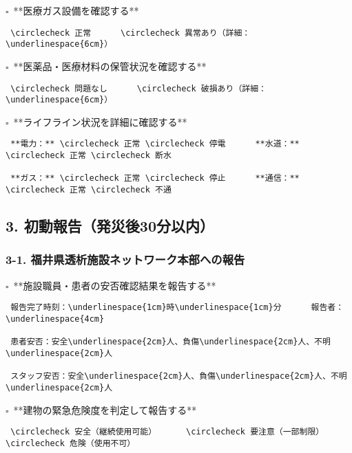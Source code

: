 \documentclass[
  japanese,
]{jarticle}
\newcommand{\checkbox}{$\square$\ }
\newcommand{\underlinespace}[1]{\underline{\hspace{#1}}}
\newcommand{\circlecheck}{$\bigcirc$\ }
\begin{document}
\checkbox **医療ガス設備を確認する**

\begin{verbatim}
 \circlecheck 正常      \circlecheck 異常あり（詳細：\underlinespace{6cm}）
\end{verbatim}

\checkbox **医薬品・医療材料の保管状況を確認する**

\begin{verbatim}
 \circlecheck 問題なし      \circlecheck 破損あり（詳細：\underlinespace{6cm}）
\end{verbatim}

\checkbox **ライフライン状況を詳細に確認する**

\begin{verbatim}
 **電力：** \circlecheck 正常 \circlecheck 停電      **水道：** \circlecheck 正常 \circlecheck 断水

 **ガス：** \circlecheck 正常 \circlecheck 停止      **通信：** \circlecheck 正常 \circlecheck 不通
\end{verbatim}

\newpage

\subsection{3.
初動報告（発災後30分以内）}\label{ux521dux52d5ux5831ux544aux767aux707dux5f8c30ux5206ux4ee5ux5185}

\subsubsection{3-1.
福井県透析施設ネットワーク本部への報告}\label{ux798fux4e95ux770cux900fux6790ux65bdux8a2dux30cdux30c3ux30c8ux30efux30fcux30afux672cux90e8ux3078ux306eux5831ux544a}

\checkbox **施設職員・患者の安否確認結果を報告する**

\begin{verbatim}
 報告完了時刻：\underlinespace{1cm}時\underlinespace{1cm}分      報告者：\underlinespace{4cm}

 患者安否：安全\underlinespace{2cm}人、負傷\underlinespace{2cm}人、不明\underlinespace{2cm}人

 スタッフ安否：安全\underlinespace{2cm}人、負傷\underlinespace{2cm}人、不明\underlinespace{2cm}人
\end{verbatim}

\checkbox **建物の緊急危険度を判定して報告する**

\begin{verbatim}
 \circlecheck 安全（継続使用可能）      \circlecheck 要注意（一部制限）      \circlecheck 危険（使用不可）
\end{verbatim}
\end{document}
